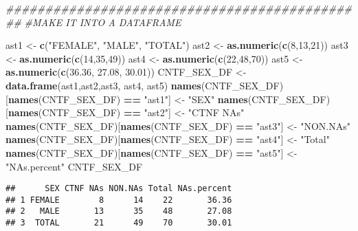 \documentclass[]{article}
\newenvironment{Shaded}{\begin{snugshade}}{\end{snugshade}}
\newcommand{\CommentTok}[1]{\textcolor[rgb]{0.56,0.35,0.01}{\textit{#1}}}
\newcommand{\DecValTok}[1]{\textcolor[rgb]{0.00,0.00,0.81}{#1}}
\newcommand{\FloatTok}[1]{\textcolor[rgb]{0.00,0.00,0.81}{#1}}
\newcommand{\KeywordTok}[1]{\textcolor[rgb]{0.13,0.29,0.53}{\textbf{#1}}}
\newcommand{\NormalTok}[1]{#1}
\newcommand{\OperatorTok}[1]{\textcolor[rgb]{0.81,0.36,0.00}{\textbf{#1}}}
\newcommand{\StringTok}[1]{\textcolor[rgb]{0.31,0.60,0.02}{#1}}
\begin{document}
\begin{Shaded}
\begin{Highlighting}[]
\CommentTok{##############################################}
\CommentTok{#MAKE IT INTO A DATAFRAME}



\NormalTok{ast1 <-}\StringTok{ }\KeywordTok{c}\NormalTok{(}\StringTok{"FEMALE"}\NormalTok{, }\StringTok{"MALE"}\NormalTok{, }\StringTok{"TOTAL"}\NormalTok{)}
\NormalTok{ast2 <-}\StringTok{ }\KeywordTok{as.numeric}\NormalTok{(}\KeywordTok{c}\NormalTok{(}\DecValTok{8}\NormalTok{,}\DecValTok{13}\NormalTok{,}\DecValTok{21}\NormalTok{))}
\NormalTok{ast3 <-}\StringTok{ }\KeywordTok{as.numeric}\NormalTok{(}\KeywordTok{c}\NormalTok{(}\DecValTok{14}\NormalTok{,}\DecValTok{35}\NormalTok{,}\DecValTok{49}\NormalTok{))}
\NormalTok{ast4 <-}\StringTok{ }\KeywordTok{as.numeric}\NormalTok{(}\KeywordTok{c}\NormalTok{(}\DecValTok{22}\NormalTok{,}\DecValTok{48}\NormalTok{,}\DecValTok{70}\NormalTok{))}
\NormalTok{ast5 <-}\StringTok{ }\KeywordTok{as.numeric}\NormalTok{(}\KeywordTok{c}\NormalTok{(}\FloatTok{36.36}\NormalTok{, }\FloatTok{27.08}\NormalTok{, }\FloatTok{30.01}\NormalTok{))}
\NormalTok{CNTF_SEX_DF <-}\StringTok{ }\KeywordTok{data.frame}\NormalTok{(ast1,ast2,ast3, ast4, ast5)}
\KeywordTok{names}\NormalTok{(CNTF_SEX_DF)[}\KeywordTok{names}\NormalTok{(CNTF_SEX_DF) }\OperatorTok{==}\StringTok{ "ast1"}\NormalTok{] <-}\StringTok{ "SEX"}
\KeywordTok{names}\NormalTok{(CNTF_SEX_DF)[}\KeywordTok{names}\NormalTok{(CNTF_SEX_DF) }\OperatorTok{==}\StringTok{ "ast2"}\NormalTok{] <-}\StringTok{ "CTNF NAs"}
\KeywordTok{names}\NormalTok{(CNTF_SEX_DF)[}\KeywordTok{names}\NormalTok{(CNTF_SEX_DF) }\OperatorTok{==}\StringTok{ "ast3"}\NormalTok{] <-}\StringTok{ "NON.NAs"}
\KeywordTok{names}\NormalTok{(CNTF_SEX_DF)[}\KeywordTok{names}\NormalTok{(CNTF_SEX_DF) }\OperatorTok{==}\StringTok{ "ast4"}\NormalTok{] <-}\StringTok{ "Total"}
\KeywordTok{names}\NormalTok{(CNTF_SEX_DF)[}\KeywordTok{names}\NormalTok{(CNTF_SEX_DF) }\OperatorTok{==}\StringTok{ "ast5"}\NormalTok{] <-}\StringTok{ "NAs.percent"}
\NormalTok{CNTF_SEX_DF}
\end{Highlighting}
\end{Shaded}

\begin{verbatim}
##      SEX CTNF NAs NON.NAs Total NAs.percent
## 1 FEMALE        8      14    22       36.36
## 2   MALE       13      35    48       27.08
## 3  TOTAL       21      49    70       30.01
\end{verbatim}
\end{document}
